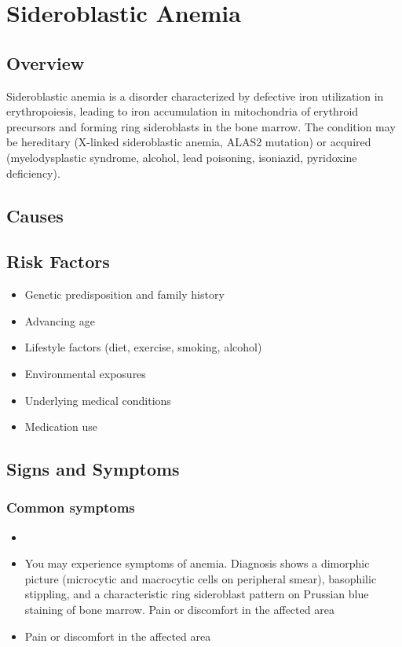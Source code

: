 \chapter{Sideroblastic Anemia}
\label{sec:Sideroblastic Anemia}

\section{Overview}
Sideroblastic anemia is a disorder characterized by defective iron utilization in erythropoiesis, leading to iron accumulation in mitochondria of erythroid precursors and forming ring sideroblasts in the bone marrow. The condition may be hereditary (X-linked sideroblastic anemia, ALAS2 mutation) or acquired (myelodysplastic syndrome, alcohol, lead poisoning, isoniazid, pyridoxine deficiency).
\section{Causes}
\section{Risk Factors}

\begin{itemize}[noitemsep]
  \item Genetic predisposition and family history
  \item Advancing age
  \item Lifestyle factors (diet, exercise, smoking, alcohol)
  \item Environmental exposures
  \item Underlying medical conditions
  \item Medication use
\end{itemize}
\section{Signs and Symptoms}

\subsection{Common symptoms}
\begin{itemize}[noitemsep]
  \item \item You may experience symptoms of anemia. Diagnosis shows a dimorphic picture (microcytic and macrocytic cells on peripheral smear), basophilic stippling, and a characteristic ring sideroblast pattern on Prussian blue staining of bone marrow. Pain or discomfort in the affected area    \item Pain or discomfort in the affected area
  \end{itemize}

